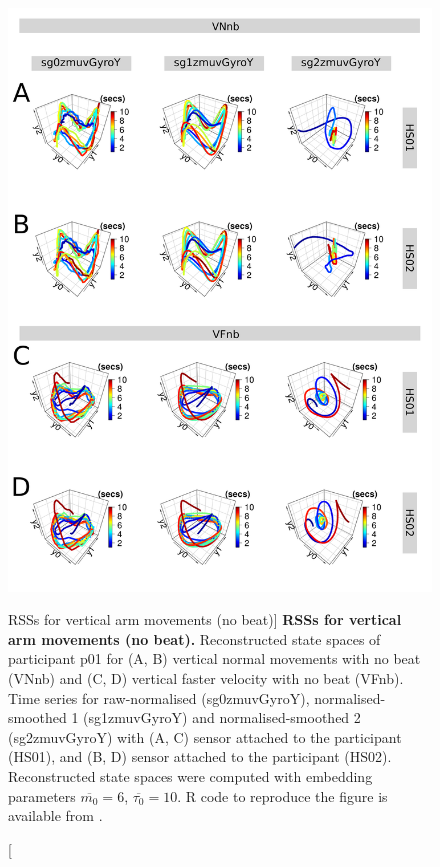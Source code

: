\begin{figure}
\centering
\includegraphics[height=0.8\textheight]{fig_5_07}
\caption
	[RSSs for vertical arm movements (no beat)]{
	{\bf RSSs for vertical arm movements (no beat).}
	Reconstructed state spaces of participant p01 for 
	(A, B) vertical normal movements with no beat (VNnb) and 
	(C, D) vertical faster velocity with no beat (VFnb).
	Time series for raw-normalised (sg0zmuvGyroY), 
	normalised-smoothed 1 (sg1zmuvGyroY) and 
	normalised-smoothed 2 (sg2zmuvGyroY) with
	(A, C) sensor attached to the participant (HS01), and
	(B, D) sensor attached to the participant (HS02).	
	Reconstructed state spaces were computed with 
	embedding parameters $\overline{m_0}=6$, $\overline{\tau_0}=10$.
	R code to reproduce the figure is available from \cite{xochicale2018}.
        }
     \label{fig:rss_Vnb_w500}
\end{figure}

